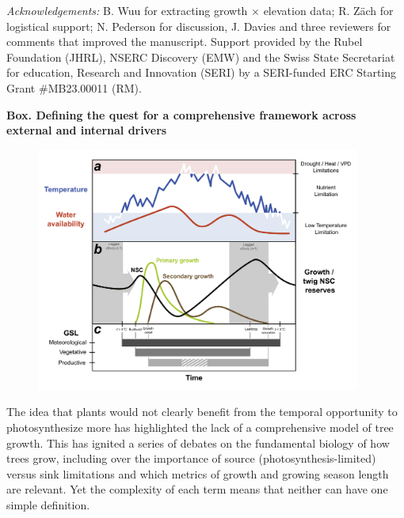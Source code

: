 \documentclass[11pt]{article}
\newcommand{\R}[1]{\label{#1}\linelabel{#1}}
\begin{document}

\emph{Acknowledgements:} B. Wuu for extracting growth $\times$ elevation data; R. Z{\"a}ch for logistical support; N. Pederson for discussion, J. Davies and three reviewers for comments that improved the manuscript. Support provided by the Rubel Foundation (JHRL), NSERC Discovery (EMW) and the Swiss State Secretariat for education, Research and Innovation (SERI) by a SERI-funded ERC Starting Grant #MB23.00011 (RM). 

\newpage
{\bf Box. Defining the quest for a comprehensive framework across external and internal drivers}
\begin{figure}[h!]
\includegraphics[width=0.95\textwidth]{..//figures/gslconcept/NEW_FI~1_ac_ver3.1.png}
\label{fig:defineGSLgrowth}
\end{figure}

\R{forbigKref2S}The idea that plants would not clearly benefit from the temporal opportunity to photosynthesize more has highlighted the lack of a comprehensive model of tree growth. This has ignited a series of debates on the fundamental biology of how trees grow, including over the importance of source (photosynthesis-limited) versus sink limitations \citep[plant growth-limited, but often via temperature, biophysical constraints, nutrients, and other arguably external factors,][]{korner2015paradigm,fatichi2019modelling,rademacher2022insights,cabon2022cross}\R{forbigKref2E} and which metrics of growth and growing season length are relevant. Yet the complexity of each term means that neither can have one simple definition. 
\end{document}
